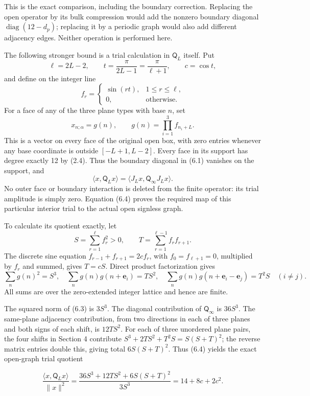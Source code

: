 \documentclass[
  11pt,
]{article}
\begin{document}
This is the exact comparison, including the boundary correction.
Replacing the open operator by its bulk compression would add the
nonzero boundary diagonal \(\operatorname{diag}(12-d_p)\); replacing it
by a periodic graph would also add different adjacency edges. Neither
operation is performed here.

The following stronger bound is a trial calculation in \(\mathsf Q_L\)
itself. Put \[
\ell=2L-2,\qquad t=\frac{\pi}{2L-1}=\frac{\pi}{\ell+1},\qquad c=\cos t,
\] and define on the integer line \[
f_r=
\begin{cases}
\sin(rt),&1\le r\le\ell,\\
0,&\text{otherwise}.
\end{cases}
\tag{6.2}
\] For a face of any of the three plane types with base \(n\), set \[
x_{n;\alpha}=g(n),\qquad
g(n)=\prod_{i=1}^3f_{n_i+L}.
\tag{6.3}
\] This is a vector on every face of the original open box, with zero
entries whenever any base coordinate is outside \([-L+1,L-2]\). Every
face in its support has degree exactly 12 by (2.4). Thus the boundary
diagonal in (6.1) vanishes on the support, and \[
\langle x,\mathsf Q_Lx\rangle
=\langle J_Lx,\mathsf Q_\infty J_Lx\rangle.
\tag{6.4}
\] No outer face or boundary interaction is deleted from the finite
operator: its trial amplitude is simply zero. Equation (6.4) proves the
required map of this particular interior trial to the actual open
signless graph.

To calculate its quotient exactly, let \[
S=\sum_{r=1}^{\ell}f_r^2>0,\qquad
T=\sum_{r=1}^{\ell-1}f_rf_{r+1}.
\] The discrete sine equation \(f_{r-1}+f_{r+1}=2cf_r\), with
\(f_0=f_{\ell+1}=0\), multiplied by \(f_r\) and summed, gives \(T=cS\).
Direct product factorization gives \[
\sum_ng(n)^2=S^3,\quad
\sum_ng(n)g(n+\mathbf e_i)=TS^2,\quad
\sum_ng(n)g(n+\mathbf e_i-\mathbf e_j)=T^2S\quad(i\ne j).
\tag{6.5}
\] All sums are over the zero-extended integer lattice and hence are
finite.

The squared norm of (6.3) is \(3S^3\). The diagonal contribution of
\(\mathsf Q_\infty\) is \(36S^3\). The same-plane adjacency
contribution, from two directions in each of three planes and both signs
of each shift, is \(12TS^2\). For each of three unordered plane pairs,
the four shifts in Section 4 contribute \(S^3+2TS^2+T^2S=S(S+T)^2\); the
reverse matrix entries double this, giving total \(6S(S+T)^2\). Thus
(6.4) yields the exact open-graph trial quotient

\[
\boxed{
\frac{\langle x,\mathsf Q_Lx\rangle}{\|x\|^2}
=\frac{36S^3+12TS^2+6S(S+T)^2}{3S^3}
=14+8c+2c^2.}
\tag{6.6}
\]
\end{document}
